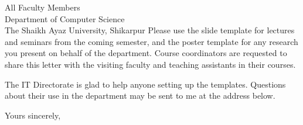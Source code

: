 \documentclass[sign=1,closing=left]{saus-letter}
\begin{document}
\begin{letter}{%
  All Faculty Members\\
  Department of Computer Science\\
  The Shaikh Ayaz University, Shikarpur}
Please use the slide template for lectures and seminars from the coming
semester, and the poster template for any research you present on behalf of the
department. Course coordinators are requested to share this letter with the
visiting faculty and teaching assistants in their courses.

The IT Directorate is glad to help anyone setting up the templates. Questions
about their use in the department may be sent to me at the address below.

\closing{Yours sincerely,}


\end{letter}
\end{document}
